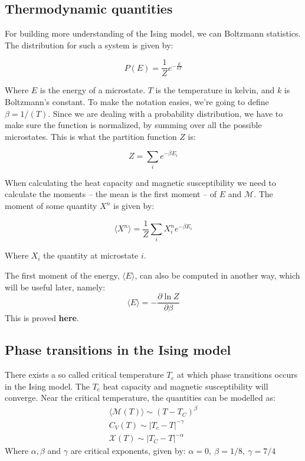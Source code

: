\documentclass[a4paper, 10pt]{article}
\begin{document}
\subsection{Thermodynamic quantities}

For building more understanding of the Ising model, we can Boltzmann statistics. The distribution for such a system is given by:

\begin{equation}\label{eq:Boltzmann_probability}
P(E)=\frac{1}{Z}e^{-\frac{E}{kT}}
\end{equation}

Where $E$ is the energy of a microstate. $T$ is the temperature in kelvin, and $k$ is Boltzmann's constant. To make the notation easies, we're going to define $\beta = 1/(T)$. Since we are dealing with a probability distribution, we have to make sure the function is normalized, by summing over all the possible microstates. This is what the partition function $Z$ is:

\begin{equation}\label{eq:Parition_function}
Z=\sum_{i} e^{-\beta E_i}
\end{equation}

When calculating the heat capacity and magnetic susceptibility we need to calculate the moments -- the mean is the first moment -- of $E$ and $\mathcal{M}$. The moment of some quantity $X^n$ is given by:

\begin{equation}
\langle X^n \rangle = \frac{1}{Z}\sum_i X_i^n e^{-\beta E_i}
\end{equation}

Where $X_i$ the quantity at microstate $i$.



The first moment of the energy, $\langle E \rangle$, can also be computed in another way, which will be useful later, namely:
\begin{equation}
\langle E \rangle = -\frac{\partial \ln Z}{\partial \beta}
\end{equation}
This is proved \textbf{here}.



\subsection{Phase transitions in the Ising model}\label{phase_tranisition}
There exists a so called critical temperature $T_c$ at which phase transitions occurs in the Ising model. The $T_c$ heat capacity and magnetic susceptibility will converge. Near the critical temperature, the quantities can be modelled as:
\begin{equation}\label{eq:analytical_thermo_near_critical}
\begin{split}
\langle \mathcal{M}(T)\rangle \sim (T-T_C)^{\beta}\\
C_V(T) \sim |T_c-T|^{-\gamma}\\
\mathcal{X}(T) \sim |T_C-T|^{-\alpha}
\end{split}
\end{equation}
Where $\alpha, \beta$ and $\gamma$ are critical exponents, given by: $\alpha=0,\  \beta=1/8,\ \gamma=7/4$\\
\end{document}
